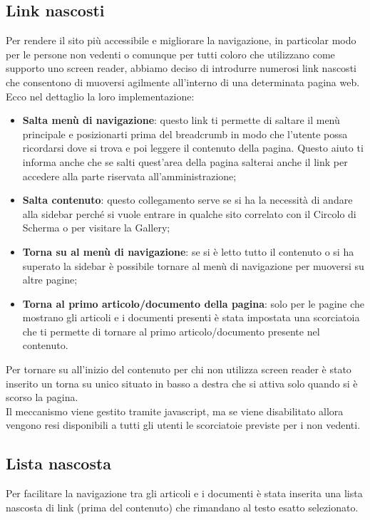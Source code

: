 \subsection{Link nascosti}
Per rendere il sito pi\`u accessibile e migliorare la navigazione, in particolar modo per le persone non vedenti o comunque per tutti coloro che utilizzano come supporto uno screen reader, abbiamo deciso di introdurre numerosi link nascosti che consentono di muoversi agilmente all'interno di una determinata pagina web. \\
Ecco nel dettaglio la loro implementazione:
	\begin{itemize}
		\item \textbf{Salta men\`u di navigazione}: questo link ti permette di saltare il men\`u principale e posizionarti prima del breadcrumb in modo che l'utente possa ricordarsi dove si trova e poi leggere il contenuto della pagina. Questo aiuto ti informa anche che se salti quest'area della pagina salterai anche il link per accedere alla parte riservata all'amministrazione;
		\item \textbf{Salta contenuto}: questo collegamento serve se si ha la necessit\`a di andare alla sidebar perch\'e si vuole entrare in qualche sito correlato con il Circolo di Scherma o per visitare la Gallery;
		\item \textbf{Torna su al men\`u di navigazione}: se si \`e letto tutto il contenuto o si ha superato la sidebar \`e possibile tornare al men\`u di navigazione per muoversi su altre pagine;
		\item \textbf{Torna al primo articolo/documento della pagina}: solo per le pagine che mostrano gli articoli e i documenti presenti \`e stata impostata una scorciatoia che ti permette di tornare al primo articolo/documento presente nel contenuto.
 
	\end{itemize}
Per tornare su all'inizio del contenuto per chi non utilizza screen reader \`e stato inserito un torna su unico situato in basso a destra che si attiva solo quando si \`e scorso la pagina.
\\ Il meccanismo viene gestito tramite javascript, ma se viene disabilitato allora vengono resi disponibili a tutti gli utenti le scorciatoie previste per i non vedenti.

\subsection{Lista nascosta}
Per facilitare la navigazione tra gli articoli e i documenti \`e stata inserita una lista nascosta di link (prima del contenuto) che rimandano al testo esatto selezionato.


